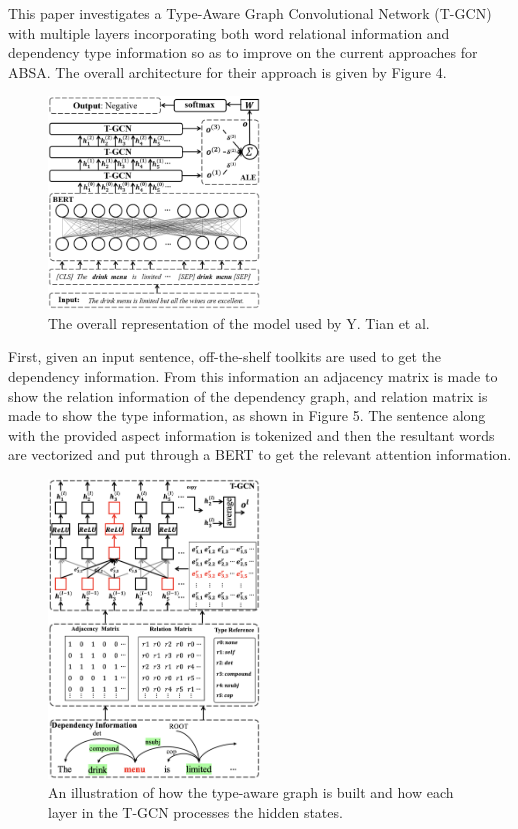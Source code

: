 \documentclass[conference]{IEEEtran}
\begin{document}
This paper investigates a Type-Aware Graph Convolutional Network (T-GCN) with multiple layers incorporating both word relational information and dependency type information so as to improve on the current approaches for ABSA. The overall architecture for their approach is given by Figure 4.

\begin{figure}[htbp]
\centerline{\includegraphics[keepaspectratio, width=0.5\textwidth]{pics/4.png}}
\caption{The overall representation of the model used by Y. Tian et al.}
\label{fig}
\end{figure}

First, given an input sentence, off-the-shelf toolkits are used to get the dependency information. From this information an adjacency matrix is made to show the relation information of the dependency graph, and relation matrix is made to show the type information, as shown in Figure 5. The sentence along with the provided aspect information is tokenized and then the resultant words are vectorized and put through a BERT to get the relevant attention information.

\begin{figure}[htbp]
\centerline{\includegraphics[keepaspectratio, width=0.5\textwidth]{pics/5.png}}
\caption{An illustration of how the type-aware graph is built and how each layer in the T-GCN processes the hidden states.}
\label{fig}
\end{figure}
\end{document}
